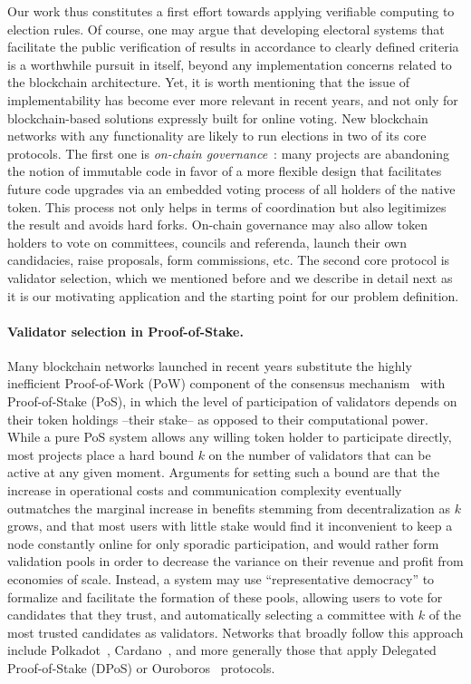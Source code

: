 Our work thus constitutes a first effort towards applying verifiable computing to election rules. 
Of course, one may argue that developing electoral systems that facilitate the public verification of results in accordance to clearly defined criteria is a worthwhile pursuit in itself, beyond any implementation concerns related to the blockchain architecture.
Yet, it is worth mentioning that the issue of implementability has become ever more relevant in recent years, and not only for blockchain-based solutions expressly built for online voting. New blockchain networks with any functionality are likely to run elections in two of its core protocols. 
The first one is \emph{on-chain governance}~\cite{beck2018governance}: many projects are abandoning the notion of immutable code in favor of a more flexible design that facilitates future code upgrades via an embedded voting process of all holders of the native token. This process not only helps in terms of coordination but also legitimizes the result and avoids hard forks. On-chain governance may also allow token holders to vote on committees, councils and referenda, launch their own candidacies, raise proposals, form commissions, etc. 
The second core protocol is validator selection, which we mentioned before and we describe in detail next as it is our motivating application and the starting point for our problem definition. 

\paragraph{Validator selection in Proof-of-Stake.}
Many blockchain networks launched in recent years substitute the highly inefficient Proof-of-Work (PoW) component of the consensus mechanism~\cite{nakamoto2019bitcoin} with Proof-of-Stake (PoS), in which the level of participation of validators depends on their token holdings --their stake-- as opposed to their computational power. 
While a pure PoS system allows any willing token holder to participate directly, most projects place a hard bound $k$ on the number of validators that can be active at any given moment. 
Arguments for setting such a bound are that the increase in operational costs and communication complexity eventually outmatches the marginal increase in benefits stemming from decentralization as $k$ grows, and that most users with little stake would find it inconvenient to keep a node constantly online for only sporadic participation, and would rather form validation pools in order to decrease the variance on their revenue and profit from economies of scale. %
%
Instead, a system may use ``representative democracy'' to formalize and facilitate the formation of these pools, allowing users to vote for candidates that they trust, and automatically selecting a committee with $k$ of the most trusted candidates as validators. Networks that broadly follow this approach include Polkadot~\cite{burdges2020overview}, Cardano~\cite{brunjes2020reward}, and more generally those that apply Delegated Proof-of-Stake (DPoS) or Ouroboros~\cite{kiayias2017ouroboros} protocols. 

